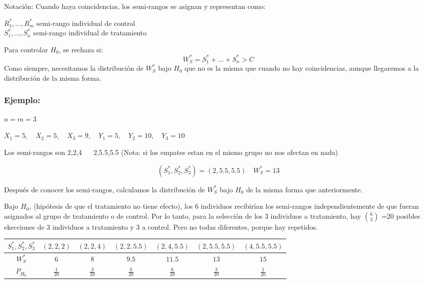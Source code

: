 Notación:
Cuando haya coincidencias, los semi-rangos se asignan y representan como:
\begin{center}
$R_1^*,\dots,R_m^*$ semi-rango individual de control \\
$S_1^*,\dots,S_n^*$ semi-rango individual de tratamiento
\end{center}

Para controlar $H_0$, se rechaza si:
\[
    W_S^*=S_1^*+\dots+S_n^*>C
\]
Como siempre, necesitamos la distribución de $W_S^*$ bajo $H_0$ que no es la misma que cuando no hay coincidencias, aunque llegaremos a la distribución de la misma forma.
\newpage

\subsubsection*{Ejemplo:}
$n=m=3$

\(
X_1=5, \quad X_2=5, \quad X_3=9, \quad Y_1=5,\quad Y_2=10,\quad Y_3=10
\)

Los semi-rangos son 2,2,4 $\quad$ 2,5.5,5.5
(Nota: si los empates estan en el mismo grupo no nos afectan en nada)

\[
(S_1^*,S_2^*,S_3^*)=(2,5.5,5.5) \quad W_S^*=13
\]

Después de conocer los semi-rangos, calculamos la distribución de $W_S^*$ bajo $H_0$ de la misma forma que anteriormente.

Bajo $H_0$, (hipótesis de que el tratamiento no tiene efecto), los 6 individuos recibirían los semi-rangos independientemente de que fueran asignados al grupo de tratamiento o de control. Por lo tanto, para la selección de los 3 individuos a tratamiento, hay $\binom{6}{3}$
=20 posibles ekecciones de 3 individuos a tratamiento y 3 a control. Pero no todas diferentes, porque hay repetidos.

\begin{table}[h!]
    \centering
    \begin{tabular}{c|c|c|c|c|c|c}
    $S_1^*,S_2^*,S_3^*$ & $(2,2,2)$ & $(2,2,4)$ & $(2,2,5.5)$ & $(2,4,5.5)$ & $(2,5.5,5.5)$ & $(4,5.5,5.5)$ \\ \hline
    $W_S^*$             & $6$       & $8$       & $9.5$       & $11.5$      & $13$          & $15$          \\ \hline
    $P_{H_0}$           & $\frac{1}{20}$ & $\frac{3}{20}$ & $\frac{6}{20}$ & $\frac{6}{20}$ & $\frac{3}{20}$ & $\frac{1}{20}$
    \end{tabular}
\end{table}


